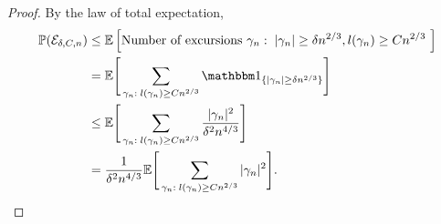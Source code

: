 \begin{proof}
	By the law of total expectation,
	\begin{equation} \label{E: P(ExcEvent) 1}
	\begin{aligned}
	\Prob(\ExcursionEvent) 
	&\leq \Exp{ \text{Number of excursions $\gamma_n: \; |\gamma_n| \geq \delta\n{2}{3},l(\gamma_n) \geq C\n{2}{3}$ } } \\
	&= \mathbb{E}\Bigg[ \sum_{\gamma_n: \; l(\gamma_n) \geq C\n{2}{3}} \Ind{\{|\gamma_n| \geq \delta\n{2}{3} \} } \Bigg] \\
	&\leq \mathbb{E}\Bigg[ \sum_{\gamma_n: \; l(\gamma_n) \geq C\n{2}{3}} \frac{|\gamma_n|^2}{\delta^2\n{4}{3}} \Bigg] \\
	&= \frac{1}{\delta^2\n{4}{3}} \mathbb{E}\Bigg[ \sum_{\gamma_n: \; l(\gamma_n) \geq C\n{2}{3}}  |\gamma_n|^2 \Bigg].
	\end{aligned}
	\end{equation}
	

\end{proof}
